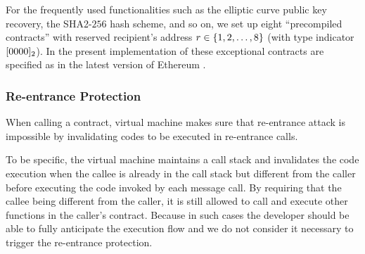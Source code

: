 For the frequently used functionalities such as the elliptic curve public key recovery, the SHA2-$256$ hash scheme, and so on, we set up eight ``precompiled contracts'' with reserved recipient's address $r\in{\left \{{1,2,\dots,8} \right \}}$ (with type indicator $[0000]_2$).
In the present implementation of \name these exceptional contracts are specified as in the latest version of Ethereum \cite{ETH_yellow}.




\subsubsection{Re-entrance Protection}
\label{subsubsec:reentrance}

When calling a contract, {\name} virtual machine makes sure that re-entrance attack is impossible by invalidating codes to be executed in re-entrance calls.

To be specific, the {\name} virtual machine maintains a call stack and 
invalidates the code execution  
when the callee is already in the call stack but different from the caller before executing the code invoked by each message call.
By requiring that the callee being different from the caller, it is still allowed to call and execute other functions in the caller's contract.
Because in such cases the developer should be able to fully anticipate the execution flow
and we do not consider it necessary to trigger the re-entrance protection.

